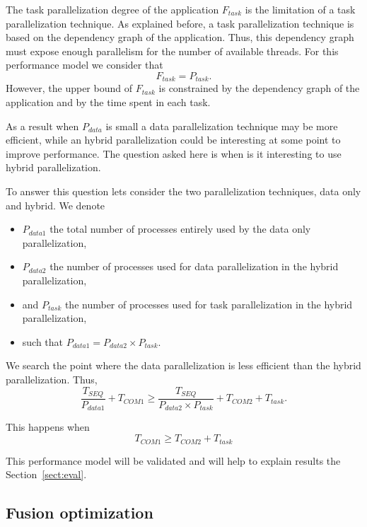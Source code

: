 The task parallelization degree of the application $F_{task}$ is the limitation of a task parallelization technique. As explained before, a task parallelization technique is based on the dependency graph of the application. Thus, this dependency graph must expose enough parallelism for the number of available threads. For this performance model we consider that 
\begin{equation*}
F_{task} = P_{task}.
\end{equation*}
However, the upper bound of $F_{task}$ is constrained by the dependency graph of the application and by the time spent in each task.

\medskip
As a result when $P_{data}$ is small a data parallelization technique may be more efficient, while an hybrid parallelization could be interesting at some point to improve performance. The question asked here is when is it interesting to use hybrid parallelization.

To answer this question lets consider the two parallelization techniques, data only and hybrid. We denote
\begin{itemize}
\item $P_{data1}$ the total number of processes entirely used by the data only parallelization,
\item $P_{data2}$ the number of processes used for data parallelization in the hybrid parallelization,
\item and $P_{task}$ the number of processes used for task parallelization in the hybrid parallelization,
\item such that $P_{data1} = P_{data2} \times P_{task}$.
\end{itemize}

We search the point where the data parallelization is less efficient than the hybrid parallelization. Thus, 
\begin{equation*}
\frac{T_{SEQ}}{P_{data1}} + T_{COM1} \geq \frac{T_{SEQ}}{P_{data2} \times P_{task}} + T_{COM2} + T_{task}.
\end{equation*}

This happens when
\begin{equation}
T_{COM1} \geq T_{COM2} + T_{task}
\end{equation}

This performance model will be validated and will help to explain results the Section~\ref{sect:eval}.

\subsection{Fusion optimization}

